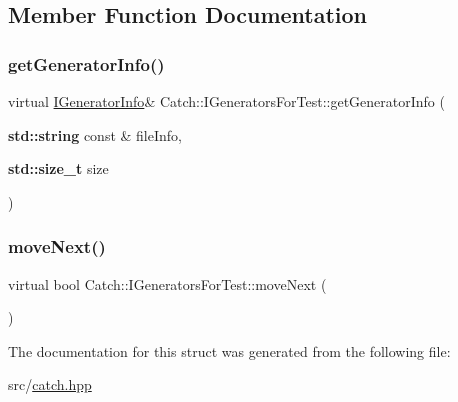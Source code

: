\subsection{Member Function Documentation}
\mbox{\label{struct_catch_1_1_i_generators_for_test_a180d84e858840188e4c3788e47eefdb0}} 
\subsubsection{\texorpdfstring{get\+Generator\+Info()}{getGeneratorInfo()}}
{\footnotesize\ttfamily virtual \hyperlink{struct_catch_1_1_i_generator_info}{I\+Generator\+Info}\& Catch\+::\+I\+Generators\+For\+Test\+::get\+Generator\+Info (\begin{DoxyParamCaption}\item[{\textbf{ std\+::string} const \&}]{file\+Info,  }\item[{\textbf{ std\+::size\+\_\+t}}]{size }\end{DoxyParamCaption})\hspace{0.3cm}{\ttfamily [pure virtual]}}

\mbox{\label{struct_catch_1_1_i_generators_for_test_adab31832d529fc584fd63164e0a1c8ad}} 
\subsubsection{\texorpdfstring{move\+Next()}{moveNext()}}
{\footnotesize\ttfamily virtual bool Catch\+::\+I\+Generators\+For\+Test\+::move\+Next (\begin{DoxyParamCaption}{ }\end{DoxyParamCaption})\hspace{0.3cm}{\ttfamily [pure virtual]}}



The documentation for this struct was generated from the following file\+:\begin{DoxyCompactItemize}
\item 
src/\hyperlink{catch_8hpp}{catch.\+hpp}\end{DoxyCompactItemize}
